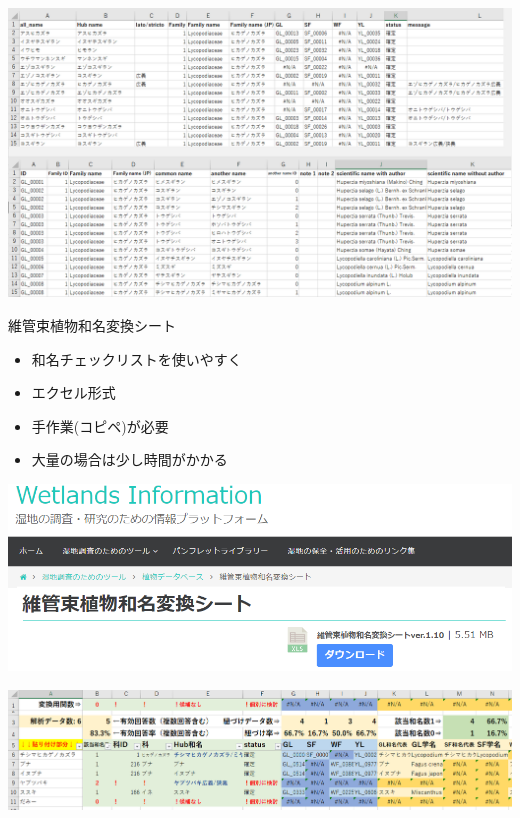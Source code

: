 \documentclass[
  a5paper,
  landscape,
  notitlepage]{report}
\providecommand{\tightlist}{%
  \setlength{\itemsep}{0pt}\setlength{\parskip}{0pt}}
\begin{document}
\newpage

\includegraphics{image/wamei_hub_jn.png}

\newpage

\fontsize{32pt}{32pt}\selectfont

\begin{center}
維管束植物和名変換シート
\end{center}

\begin{itemize}
\tightlist
\item
  和名チェックリストを使いやすく\\
\item
  エクセル形式\\
\item
  手作業(コピペ)が必要\\
\item
  大量の場合は少し時間がかかる
\end{itemize}

\newpage

\includegraphics{image/convert_web.png}

\vspace{20pt}

\includegraphics{image/convert_convert.png}
\end{document}
